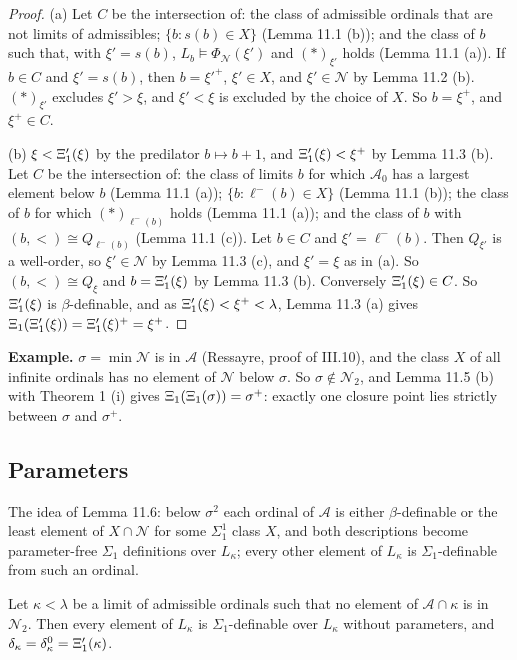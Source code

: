 \documentclass[11pt]{article}
\begin{document}
\begin{proof} (a) Let $C$ be the intersection of: the class of admissible ordinals that are not limits of
admissibles; $\{b : s(b) \in X\}$ (Lemma 11.1 (b)); and the class of $b$ such that, with $\xi' = s(b)$,
$L_b \models \Phi_{\mathcal N}(\xi')$ and $(\ast)_{\xi'}$ holds (Lemma 11.1 (a)). If $b \in C$ and $\xi' = s(b)$, then
$b = \xi'^+$, $\xi' \in X$, and $\xi' \in \mathcal N$ by Lemma 11.2 (b). $(\ast)_{\xi'}$ excludes $\xi' > \xi$, and
$\xi' < \xi$ is excluded by the choice of $X$. So $b = \xi^+$, and $\xi^+ \in C$.

(b) $\xi < \Xi'_1(\xi)$ by the predilator $b \mapsto b + 1$, and $\Xi'_1(\xi) < \xi^+$ by Lemma 11.3 (b). Let $C$ be the
intersection of: the class of limits $b$ for which $\mathcal A_0$ has a largest element below $b$ (Lemma 11.1 (a));
$\{b : \ell^-(b) \in X\}$ (Lemma 11.1 (b)); the class of $b$ for which $(\ast)_{\ell^-(b)}$ holds (Lemma 11.1 (a));
and the class of $b$ with $(b, <) \cong Q_{\ell^-(b)}$ (Lemma 11.1 (c)). Let $b \in C$ and
$\xi' = \ell^-(b)$. Then $Q_{\xi'}$ is a well-order, so $\xi' \in \mathcal N$ by Lemma 11.3 (c), and $\xi' = \xi$
as in (a). So $(b, <) \cong Q_{\xi}$ and $b = \Xi'_1(\xi)$ by Lemma 11.3 (b). Conversely $\Xi'_1(\xi) \in C$. So
$\Xi'_1(\xi)$ is $\beta$-definable, and as $\Xi'_1(\xi) < \xi^+ < \lambda$, Lemma 11.3 (a) gives
$\Xi_1(\Xi'_1(\xi)) = \Xi'_1(\xi)^+ = \xi^+$.
\end{proof}

\textbf{Example.} $\sigma = \min \mathcal N$ is in $\mathcal A$ (Ressayre, proof of III.10), and the class $X$ of all
infinite ordinals has no element of $\mathcal N$ below $\sigma$. So $\sigma \notin \mathcal N_2$, and Lemma 11.5 (b)
with Theorem 1 (i) gives $\Xi_1(\Xi_1(\sigma)) = \sigma^+$: exactly one closure point lies strictly between $\sigma$
and $\sigma^+$.

\subsection{Parameters}

The idea of Lemma 11.6: below $\sigma^2$ each ordinal of $\mathcal A$ is either $\beta$-definable or the least
element of $X \cap \mathcal N$ for some $\Sigma^1_1$ class $X$, and both descriptions become parameter-free
$\Sigma_1$ definitions over $L_{\kappa}$; every other element of $L_{\kappa}$ is $\Sigma_1$-definable from such an
ordinal.

\begin{statement} Let $\kappa < \lambda$ be a limit of admissible ordinals such that no element of
$\mathcal A \cap \kappa$ is in $\mathcal N_2$. Then every element of $L_{\kappa}$ is $\Sigma_1$-definable over
$L_{\kappa}$ without parameters, and $\delta_{\kappa} = \delta^0_{\kappa} = \Xi'_1(\kappa)$.
\end{statement}
\end{document}
